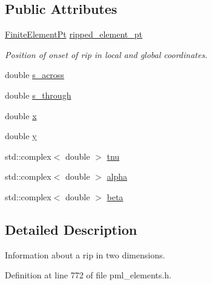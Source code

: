 \subsection*{Public Attributes}
\begin{DoxyCompactItemize}
\item 
\hyperlink{namespaceoomph_a3a774afab5900fed47e092a013f9efb8}{Finite\+Element\+Pt} \hyperlink{structoomph_1_1TangentiallyDiscontinuousConformal2DPMLElement_1_1TwoDimRip_a2808306cb7a88c96122af09c76d22f51}{ripped\+\_\+element\+\_\+pt}
\begin{DoxyCompactList}\small\item\em Position of onset of rip in local and global coordinates. \end{DoxyCompactList}\item 
double \hyperlink{structoomph_1_1TangentiallyDiscontinuousConformal2DPMLElement_1_1TwoDimRip_a2152ee92d801d56663917dfe76f02059}{s\+\_\+across}
\item 
double \hyperlink{structoomph_1_1TangentiallyDiscontinuousConformal2DPMLElement_1_1TwoDimRip_acccff7acf91921b1366dd808d41266e1}{s\+\_\+through}
\item 
double \hyperlink{structoomph_1_1TangentiallyDiscontinuousConformal2DPMLElement_1_1TwoDimRip_a745d089012538b48a8f24e7356ea8be0}{x}
\item 
double \hyperlink{structoomph_1_1TangentiallyDiscontinuousConformal2DPMLElement_1_1TwoDimRip_af2081c6f577dfc1aaa732bb67b14bcca}{y}
\item 
std\+::complex$<$ double $>$ \hyperlink{structoomph_1_1TangentiallyDiscontinuousConformal2DPMLElement_1_1TwoDimRip_a3ce793a545c5477771a6f02ccbafd2f6}{tnu}
\item 
std\+::complex$<$ double $>$ \hyperlink{structoomph_1_1TangentiallyDiscontinuousConformal2DPMLElement_1_1TwoDimRip_afe6c1339363823496527b537316c877d}{alpha}
\item 
std\+::complex$<$ double $>$ \hyperlink{structoomph_1_1TangentiallyDiscontinuousConformal2DPMLElement_1_1TwoDimRip_a6dc020a09af5c84b63856302fc94f5dd}{beta}
\end{DoxyCompactItemize}


\subsection{Detailed Description}
Information about a rip in two dimensions. 

Definition at line 772 of file pml\+\_\+elements.\+h.



